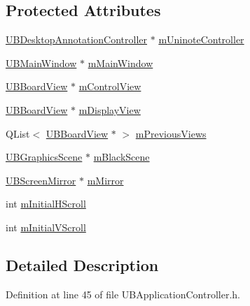 \subsection*{Protected Attributes}
\begin{DoxyCompactItemize}
\item 
\hyperlink{class_u_b_desktop_annotation_controller}{U\-B\-Desktop\-Annotation\-Controller} $\ast$ \hyperlink{class_u_b_application_controller_a5c3c538c6d76d4c6ca4b704467be70e6}{m\-Uninote\-Controller}
\item 
\hyperlink{class_u_b_main_window}{U\-B\-Main\-Window} $\ast$ \hyperlink{class_u_b_application_controller_a3b60b448f860a081e76a11eb5eafc237}{m\-Main\-Window}
\item 
\hyperlink{class_u_b_board_view}{U\-B\-Board\-View} $\ast$ \hyperlink{class_u_b_application_controller_a20de84a057fe13ec2ee6bf4a03ccead0}{m\-Control\-View}
\item 
\hyperlink{class_u_b_board_view}{U\-B\-Board\-View} $\ast$ \hyperlink{class_u_b_application_controller_a6257fdd4f0d1592be5e37489147a4f66}{m\-Display\-View}
\item 
Q\-List$<$ \hyperlink{class_u_b_board_view}{U\-B\-Board\-View} $\ast$ $>$ \hyperlink{class_u_b_application_controller_acd65c7cfb4d0426d7c539b1e9549fa0b}{m\-Previous\-Views}
\item 
\hyperlink{class_u_b_graphics_scene}{U\-B\-Graphics\-Scene} $\ast$ \hyperlink{class_u_b_application_controller_aa46c5585a93df309cc911635e211d6bd}{m\-Black\-Scene}
\item 
\hyperlink{class_u_b_screen_mirror}{U\-B\-Screen\-Mirror} $\ast$ \hyperlink{class_u_b_application_controller_a9155b8fecaa89d7565ad2a1820dc6d0b}{m\-Mirror}
\item 
int \hyperlink{class_u_b_application_controller_a8fd9fa4e3d231100be679a62c76b2cd6}{m\-Initial\-H\-Scroll}
\item 
int \hyperlink{class_u_b_application_controller_a1d10c0cdb9d2dd2b0f81c15aa8429e02}{m\-Initial\-V\-Scroll}
\end{DoxyCompactItemize}


\subsection{Detailed Description}


Definition at line 45 of file U\-B\-Application\-Controller.\-h.



